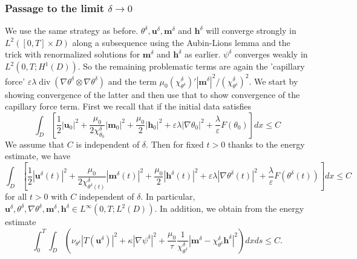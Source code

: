 \documentclass[10pt,letterpaper,twoside]{amsart}
\theoremstyle{definition}{\newtheorem{definition}[lemma]{Definition}}
\theoremstyle{note}{\newtheorem{claim}{Claim}[section]
\newtheorem*{claim*}{Claim}}
\numberwithin{equation}{section}
\newcommand{\dom}{D}
\newcommand{\eps}{\varepsilon}
\newcommand{\Grad}{\nabla}
\newcommand{\Div}{\operatorname{div}}
\newcommand{\bu}{\mathbf{u}}
\newcommand{\bm}{\mathbf{m}}
\newcommand{\bh}{\mathbf{h}}
\newcommand{\bud}{\mathbf{u}^\delta}
\newcommand{\bmd}{\mathbf{m}^\delta}
\newcommand{\bhd}{\mathbf{h}^\delta}
\newcommand{\td}{\theta^\delta}
\begin{document}
\subsubsection{Passage to the limit $\delta\to 0$}
We use the same strategy as before.  $\td, \bud, \bmd$ and $\bhd$ will converge strongly in $L^2([0,T]\times\dom)$ along a subsequence using the Aubin-Lions lemma and the trick with renormalized solutions for $\bmd$ and $\bhd$ as earlier.  $\psi^{\delta}$ converges weakly in $L^2(0,T;H^1(\dom))$. So the remaining problematic terms are again the 'capillary force' $\varepsilon \lambda\Div(\Grad\td\otimes\Grad\td)$ and the term $\mu_0(\chi^\delta_{\td})' |\bmd|^2/(\chi_{\td}^\delta)^2$. We start by showing convergence of the latter and then use that to show convergence of the capillary force term. First we recall that if the initial data satisfies
\begin{equation*}
 \int_{\dom} \left[\frac{1}{2}|\bu_0|^2 + \frac{\mu_0}{2\chi^\delta_{\theta_0}}|\bm_0|^2 + \frac{\mu_0}{2}|\bh_0|^2 +\eps\lambda|\Grad\theta_0|^2+\frac{\lambda}{\eps}F(\theta_0) \right] dx\leq C
\end{equation*}
We assume that $C$ is independent of $\delta$. Then for fixed $t>0$ thanks to the energy estimate, we have
\begin{equation*}
	 \int_{\dom} \left[\frac{1}{2}|\bud(t)|^2 + \frac{\mu_0}{2\chi^\delta_{\td(t)}}|\bmd(t)|^2 + \frac{\mu_0}{2}|\bhd(t)|^2 +\eps\lambda|\Grad\td(t)|^2+\frac{\lambda}{\eps}F(\td(t)) \right] dx\leq C
\end{equation*}
for all $t>0$ with $C$ independent of $\delta$.  In particular, $\bud,\td,\Grad\td,\bmd,\bhd\in L^\infty(0,T;L^2(\dom))$.
In addition, we obtain from the energy estimate
\begin{equation*}
	\int_0^T \int_{\dom}\left( \nu_{\td}|T(\bud)|^2 +\kappa |\Grad\psi^\delta|^2+\frac{\mu_0}{\tau}\frac{1}{\chi^\delta_{\td}}|\bmd-\chi^\delta_{\td}\bhd|^2 \right)dx ds\leq C.
 \end{equation*}
\end{document}

